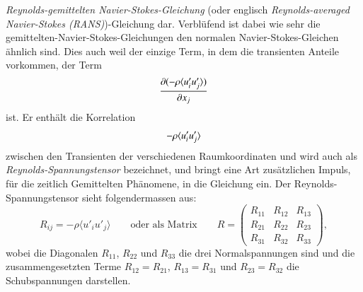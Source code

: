 \emph{Reynolds-gemittelten Navier-Stokes-Gleichung} (oder englisch \emph{Reynolds-averaged
%
%
Navier-Stokes (RANS)})-Gleichung dar.
%
Verblüfend ist dabei wie sehr die gemittelten-Navier-Stokes-Gleichungen den normalen Navier-Stokes-Gleichen ähnlich sind.
Dies auch weil der einzige Term, in dem die transienten Anteile vorkommen,
der Term
%
\begin{equation*}
    \frac{\partial(- \rho \ravg{u_i' u_j'})}{\partial x_j}
\end{equation*}
ist.
%
Er enthält die Korrelation
%
\[
- \rho \ravg{u_i' u_j'}
\]
%
zwischen den Transienten der verschiedenen Raumkoordinaten und wird auch als \emph{Reynolds-Spannungstensor}
%
bezeichnet, und bringt eine Art zusätzlichen Impuls, für die zeitlich Gemittelten Phänomene, in die Gleichung ein.
Der Reynolds-Spannungstensor sieht folgendermassen aus:
%
\begin{equation*}
    R_{ij} = -\rho \langle u'_iu'_j\rangle
    \qquad\text{oder als Matrix}\qquad
    R
    =
    \begin{pmatrix}
        R_{11} & R_{12} & R_{13} \\
        R_{21} & R_{22} & R_{23} \\
        R_{31} & R_{32} & R_{33}
    \end{pmatrix},
\end{equation*}
%
wobei die Diagonalen $R_{11}$, $R_{22}$ und $R_{33}$ die drei Normalspannungen sind
und die zusammengesetzten Terme $R_{12} = R_{21}$, $R_{13} = R_{31}$ und $R_{23} = R_{32}$ die Schubspannungen darstellen.
%
